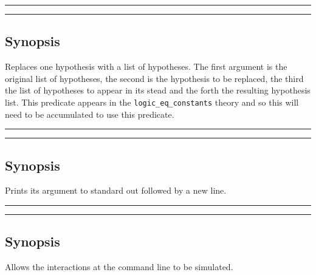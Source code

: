 \vspace{2mm}
\hrule
\vspace{2mm}
\begin{Large}
\end{Large}
\vspace{2mm}
\hrule
\vspace{2mm}


\subsection*{Synopsis}
Replaces one hypothesis with a list of hypotheses.  The first argument 
is the original list of hypotheses, the second is the hypothesis to be 
replaced, the third the list of hypotheses to appear in its stead and
the forth the resulting hypothesis list.  This predicate appears in the
{\tt logic\_eq\_constants} theory and so
this will need to be accumulated to use this predicate.

\vspace{2mm}
\hrule
\vspace{2mm}
\begin{Large}
\end{Large}
\vspace{2mm}
\hrule
\vspace{2mm}


\subsection*{Synopsis}
Prints its argument to standard out followed by a new line.

\vspace{2mm}
\hrule
\vspace{2mm}
\begin{Large}
\end{Large}
\vspace{2mm}
\hrule
\vspace{2mm}


\subsection*{Synopsis}
Allows the interactions at the command line to be simulated.

